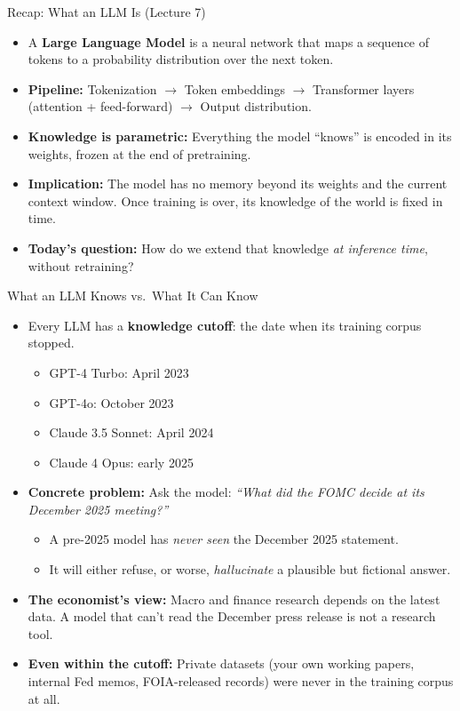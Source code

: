 \begin{frame}{Recap: What an LLM Is (Lecture 7)}
\begin{itemize}
\item A \textbf{Large Language Model} is a neural network that maps a sequence of tokens to a probability distribution over the next token.

\medskip
\item \textbf{Pipeline:} Tokenization $\to$ Token embeddings $\to$ Transformer layers (attention + feed-forward) $\to$ Output distribution.

\medskip
\item \textbf{Knowledge is parametric:} Everything the model ``knows'' is encoded in its weights, frozen at the end of pretraining.

\medskip
\item \textbf{Implication:} The model has no memory beyond its weights and the current context window. Once training is over, its knowledge of the world is fixed in time.

\medskip
\item \textbf{Today's question:} How do we extend that knowledge \emph{at inference time}, without retraining?
\end{itemize}
\end{frame}

\begin{frame}{What an LLM Knows vs.\ What It Can Know}
\begin{itemize}
\item Every LLM has a \textbf{knowledge cutoff}: the date when its training corpus stopped.
\begin{itemize}
    \item GPT-4 Turbo: April 2023
    \item GPT-4o: October 2023
    \item Claude 3.5 Sonnet: April 2024
    \item Claude 4 Opus: early 2025
\end{itemize}

\medskip
\item \textbf{Concrete problem:} Ask the model: \emph{``What did the FOMC decide at its December 2025 meeting?''}
\begin{itemize}
    \item A pre-2025 model has \emph{never seen} the December 2025 statement.
    \item It will either refuse, or worse, \emph{hallucinate} a plausible but fictional answer.
\end{itemize}

\medskip
\item \textbf{The economist's view:} Macro and finance research depends on the latest data. A model that can't read the December press release is not a research tool.

\medskip
\item \textbf{Even within the cutoff:} Private datasets (your own working papers, internal Fed memos, FOIA-released records) were never in the training corpus at all.
\end{itemize}
\end{frame}


